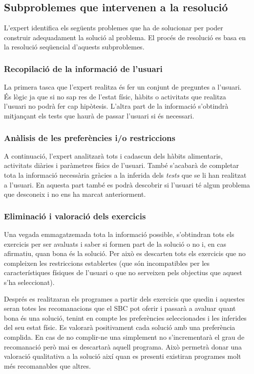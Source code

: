 \documentclass[a4paper, 12pt, UTF8]{article}
\begin{document}
\subsection{Subproblemes que intervenen a la resolució}

L'expert identifica els següents problemes que ha de solucionar per poder construir adequadament la solució al problema. El procés de resolució es basa en la resolució seqüencial d'aquests subproblemes.

\subsubsection*{Recopilació de la informació de l'usuari}

La primera tasca que l'expert realitza és fer un conjunt de preguntes a l'usuari. És lògic ja que si no sap res de l'estat físic, hàbits o activitats que realitza l'usuari no podrà fer cap hipòtesis. L'altra part de la informació s'obtindrà mitjançant els tests que haurà de passar l'usuari si és necessari. 

\subsubsection*{Anàlisis de les preferències i/o restriccions}

A continuació, l'expert analitzarà tots i cadascun dels hàbits alimentaris, activitats diàries i paràmetres físics de l'usuari. També s'acabarà de completar tota la informació necessària gràcies a la inferida dels \emph{tests} que se li han realitzat a l'usuari. En aquesta part també es podrà descobrir si l'usuari té algun problema que desconeix i no ens ha marcat anteriorment.

\subsubsection*{Eliminació i valoració dels exercicis}

Una vegada emmagatzemada tota la informació possible, s'obtindran tots els exercicis per ser avaluats i saber si formen part de la solució o no i, en cas afirmatiu, quan bona és la solució. Per això es descarten tots els exercicis que no compleixen les restriccions establertes (que són incompatibles per les característiques físiques de l'usuari o que no serveixen pels objectius que aquest s'ha seleccionat).

Després es realitzaran els programes a partir dels exercicis que quedin i aquestes seran totes les recomanacions que el SBC pot oferir i passarà a avaluar quant bona és una solució, tenint en compte les preferències seleccionades i les inferides del seu estat físic. Es valorarà positivament cada solució amb una preferència complida. En cas de no complir-ne una simplement no s'incrementarà el grau de recomanació però mai es descartarà aquell programa. Això permetrà donar una valoració qualitativa a la solució així quan es presenti existiran programes molt més recomanables que altres.
\end{document}
